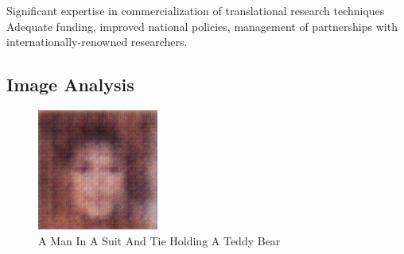 \documentclass{article}%
\begin{document}
Significant expertise in commercialization of translational research techniques\newline%
Adequate funding, improved national policies, management of partnerships with internationally{-}renowned researchers.

%
\subsection{Image Analysis}%
\label{subsec:ImageAnalysis}%


\begin{figure}[h!]%
\centering%
\includegraphics[width=150px]{500_fake_images/samples_5_457.png}%
\caption{A Man In A Suit And Tie Holding A Teddy Bear}%
\end{figure}

%
\end{document}
